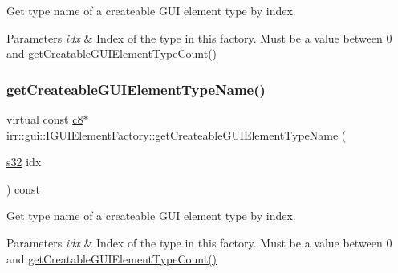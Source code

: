 Get type name of a createable G\+UI element type by index. 


\begin{DoxyParams}{Parameters}
{\em idx} & Index of the type in this factory. Must be a value between 0 and \hyperlink{classirr_1_1gui_1_1IGUIElementFactory_aae56378de5264978e70d11a36fff02e9}{get\+Creatable\+G\+U\+I\+Element\+Type\+Count()} \\
\hline
\end{DoxyParams}
\mbox{\label{classirr_1_1gui_1_1IGUIElementFactory_aa8007c17ea40b74666c1d04c9d4de85f}} 
\subsubsection{\texorpdfstring{get\+Createable\+G\+U\+I\+Element\+Type\+Name()}{getCreateableGUIElementTypeName()}\hspace{0.1cm}{\footnotesize\ttfamily [2/4]}}
{\footnotesize\ttfamily virtual const \hyperlink{namespaceirr_a9395eaea339bcb546b319e9c96bf7410}{c8}$\ast$ irr\+::gui\+::\+I\+G\+U\+I\+Element\+Factory\+::get\+Createable\+G\+U\+I\+Element\+Type\+Name (\begin{DoxyParamCaption}\item[{\hyperlink{namespaceirr_ac66849b7a6ed16e30ebede579f9b47c6}{s32}}]{idx }\end{DoxyParamCaption}) const\hspace{0.3cm}{\ttfamily [pure virtual]}}



Get type name of a createable G\+UI element type by index. 


\begin{DoxyParams}{Parameters}
{\em idx} & Index of the type in this factory. Must be a value between 0 and \hyperlink{classirr_1_1gui_1_1IGUIElementFactory_aae56378de5264978e70d11a36fff02e9}{get\+Creatable\+G\+U\+I\+Element\+Type\+Count()} \\
\hline
\end{DoxyParams}
\mbox{\label{classirr_1_1gui_1_1IGUIElementFactory_a1e692e1f746ee69815bf25981ee0facf}} 
